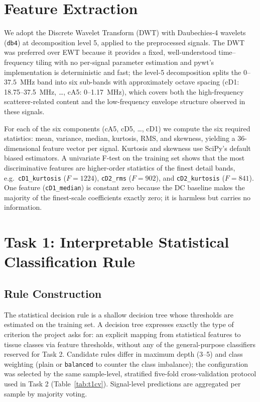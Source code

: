 \documentclass[11pt]{article}
\begin{document}
\section{Feature Extraction}

We adopt the Discrete Wavelet Transform (DWT) with Daubechies-4 wavelets
(\texttt{db4}) at decomposition level 5, applied to the preprocessed signals.
The DWT was preferred over EWT because it provides a fixed, well-understood
time--frequency tiling with no per-signal parameter estimation and pywt's
implementation is deterministic and fast; the level-5 decomposition splits the
$0$--$37.5$~MHz band into six sub-bands with approximately octave spacing
(cD1: 18.75--37.5~MHz, \dots, cA5: 0--1.17~MHz), which covers both the
high-frequency scatterer-related content and the low-frequency envelope
structure observed in these signals.

For each of the six components (cA5, cD5, \dots, cD1) we compute the six
required statistics: mean, variance, median, kurtosis, RMS, and skewness,
yielding a 36-dimensional feature vector per signal. Kurtosis and skewness use
SciPy's default biased estimators. A univariate F-test on the training set
shows that the most discriminative features are higher-order statistics of the
finest detail bands, e.g.\ \texttt{cD1\_kurtosis} ($F=1224$),
\texttt{cD2\_rms} ($F=902$), and \texttt{cD2\_kurtosis} ($F=841$). One feature
(\texttt{cD1\_median}) is constant zero because the DC baseline makes the
majority of the finest-scale coefficients exactly zero; it is harmless but
carries no information.

\section{Task 1: Interpretable Statistical Classification Rule}

\subsection{Rule Construction}

The statistical decision rule is a shallow decision tree whose thresholds are
estimated on the training set. A decision tree expresses exactly the type of
criterion the project asks for: an explicit mapping from statistical features
to tissue classes via feature thresholds, without any of the general-purpose
classifiers reserved for Task 2. Candidate rules differ in maximum depth
(3--5) and class weighting (plain or \texttt{balanced} to counter the class
imbalance); the configuration was selected by the same sample-level,
stratified five-fold cross-validation protocol used in Task 2 (Table~\ref{tab:t1cv}).
Signal-level predictions are aggregated per sample by majority voting.
\end{document}
